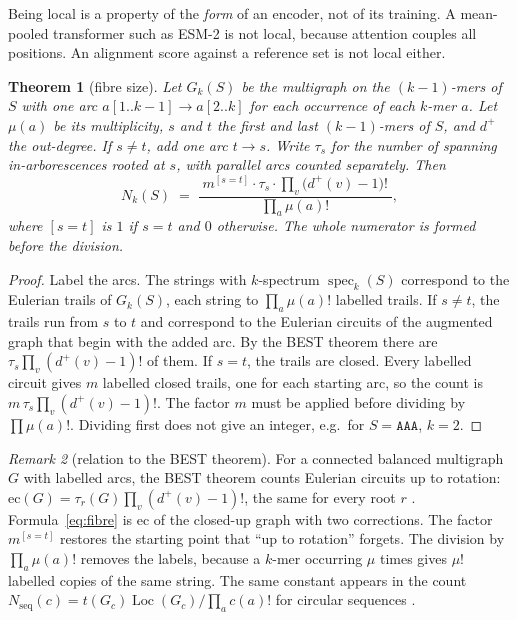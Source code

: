\documentclass[11pt]{article}
\theoremstyle{plain}
\newtheorem{theorem}{Theorem}
\theoremstyle{definition}
\theoremstyle{remark}
\newtheorem{remark}[theorem]{Remark}
\newcommand{\spec}{\operatorname{spec}}
\begin{document}
Being local is a property of the \emph{form} of an encoder, not of its training. A mean-pooled
transformer such as ESM-2 is not local, because attention couples all positions. An alignment
score against a reference set is not local either.

\begin{theorem}[fibre size]\label{thm:fibre}
Let $G_k(S)$ be the multigraph on the $(k-1)$-mers of $S$ with one arc $a[1..k-1]\to a[2..k]$ for each
occurrence of each $k$-mer $a$. Let $\mu(a)$ be its multiplicity, $s$ and $t$ the first and last
$(k-1)$-mers of $S$, and $d^{+}$ the out-degree. If $s\ne t$, add one arc $t\to s$. Write $\tau_s$ for
the number of spanning in-arborescences rooted at $s$, with parallel arcs counted separately. Then
\begin{equation}\label{eq:fibre}
N_k(S)\;=\;\frac{\;m^{[s=t]}\cdot\tau_s\cdot\prod_v\bigl(d^{+}(v)-1\bigr)!\;}{\prod_a\mu(a)!},
\end{equation}
where $[s=t]$ is $1$ if $s=t$ and $0$ otherwise. The whole numerator is formed before the division.
\end{theorem}

\begin{proof}
Label the arcs. The strings with $k$-spectrum $\spec_k(S)$ correspond to the Eulerian trails of
$G_k(S)$, each string to $\prod_a\mu(a)!$ labelled trails. If $s\ne t$, the trails run from $s$ to
$t$ and correspond to the Eulerian circuits of the augmented graph that begin with the added arc. By the
BEST theorem \cite{BEST} there are $\tau_s\prod_v(d^{+}(v)-1)!$ of them. If $s=t$, the trails are closed.
Every labelled circuit gives $m$ labelled closed trails, one for each starting arc, so the count is
$m\,\tau_s\prod_v(d^{+}(v)-1)!$. The factor $m$ must be applied before dividing by $\prod\mu(a)!$.
Dividing first does not give an integer, e.g.\ for $S=\mathtt{AAA}$, $k=2$.
\end{proof}

\begin{remark}[relation to the BEST theorem]\label{rem:best}
For a connected balanced multigraph $G$ with labelled arcs, the BEST theorem counts Eulerian circuits
up to rotation: $\mathrm{ec}(G)=\tau_r(G)\prod_v(d^{+}(v)-1)!$, the same for every root $r$
\cite{BEST}. Formula~\eqref{eq:fibre} is $\mathrm{ec}$ of the closed-up graph with two corrections. The
factor $m^{[s=t]}$ restores the starting point that ``up to rotation'' forgets. The division by
$\prod_a\mu(a)!$ removes the labels, because a $k$-mer occurring $\mu$ times gives $\mu!$ labelled
copies of the same string. The same constant appears in the count
$N_{\mathrm{seq}}(c)=t(G_c)\operatorname{Loc}(G_c)/\prod_ac(a)!$ for circular sequences
\cite[Ch.~7, Theorem~7.6 and Remark~7.7, p.~52]{AG}.
\end{remark}
\end{document}
